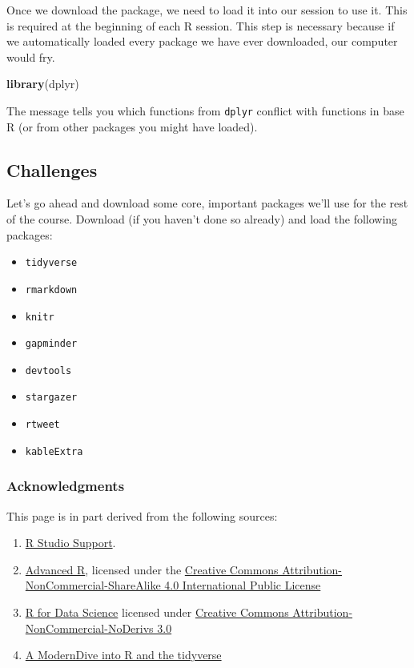 \documentclass[]{book}
\newenvironment{Shaded}{\begin{snugshade}}{\end{snugshade}}
\newcommand{\KeywordTok}[1]{\textcolor[rgb]{0.13,0.29,0.53}{\textbf{#1}}}
\newcommand{\NormalTok}[1]{#1}
\providecommand{\tightlist}{%
  \setlength{\itemsep}{0pt}\setlength{\parskip}{0pt}}
\begin{document}
Once we download the package, we need to load it into our session to use it. This is required at the beginning of each R session. This step is necessary because if we automatically loaded every package we have ever downloaded, our computer would fry.

\begin{Shaded}
\begin{Highlighting}[]
\KeywordTok{library}\NormalTok{(dplyr)}
\end{Highlighting}
\end{Shaded}

The message tells you which functions from \texttt{dplyr} conflict with functions in base R (or from other packages you might have loaded).

\hypertarget{challenges}{%
\subsection{Challenges}\label{challenges}}

Let's go ahead and download some core, important packages we'll use for the rest of the course. Download (if you haven't done so already) and load the following packages:

\begin{itemize}
\tightlist
\item
  \texttt{tidyverse}
\item
  \texttt{rmarkdown}
\item
  \texttt{knitr}
\item
  \texttt{gapminder}
\item
  \texttt{devtools}
\item
  \texttt{stargazer}
\item
  \texttt{rtweet}
\item
  \texttt{kableExtra}
\end{itemize}

\hypertarget{acknowledgments-1}{%
\subsubsection*{Acknowledgments}\label{acknowledgments-1}}

This page is in part derived from the following sources:

\begin{enumerate}
\def\labelenumi{\arabic{enumi}.}
\item
  \href{https://support.rstudio.com/hc/en-us/articles/200484448}{R Studio Support}.
\item
  \href{https://adv-r.hadley.nz/}{Advanced R}, licensed under the \href{https://creativecommons.org/licenses/by-nc-sa/4.0/}{Creative Commons Attribution-NonCommercial-ShareAlike 4.0 International Public License}
\item
  \href{https://r4ds.had.co.nz}{R for Data Science} licensed under \href{https://creativecommons.org/licenses/by-nc-nd/3.0/us/}{Creative Commons Attribution-NonCommercial-NoDerivs 3.0}
\item
  \href{https://moderndive.netlify.com/1-getting-started.html}{A ModernDive into R and the tidyverse}
\end{enumerate}
\end{document}
